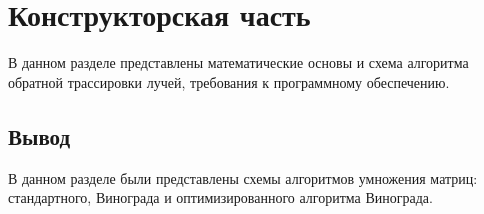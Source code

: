 \chapter{Конструкторская часть}

В данном разделе представлены математические основы и схема алгоритма обратной трассировки лучей, требования к программному обеспечению. 

%
%
%


\section*{Вывод}

В данном разделе были представлены схемы алгоритмов умножения матриц: стандартного, Винограда
и оптимизированного алгоритма Винограда.

\clearpage
